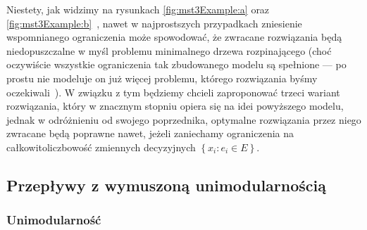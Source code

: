 Niestety, jak widzimy na rysunkach \ref{fig:mst3Example:a} oraz \ref{fig:mst3Example:b}~\cite[$41$]{Magnanti1995503}, nawet w najprostszych przypadkach zniesienie wspomnianego ograniczenia może spowodować, że zwracane rozwiązania będą niedopuszczalne w myśl problemu minimalnego drzewa rozpinającego (choć oczywiście wszystkie ograniczenia tak zbudowanego modelu są spełnione --- po prostu nie modeluje on już więcej problemu, którego rozwiązania byśmy oczekiwali~\cite[$39$]{Magnanti1995503}). W związku z tym będziemy chcieli zaproponować trzeci wariant rozwiązania, który w znacznym stopniu opiera się na idei powyższego modelu, jednak w odróżnieniu od swojego poprzednika, optymalne rozwiązania przez niego zwracane będą poprawne nawet, jeżeli zaniechamy ograniczenia na całkowitoliczbowość zmiennych decyzyjnych $\left\{ x_{i} : e_{i} \in E \right\}$.

\subsection{Przepływy z wymuszoną unimodularnością}

\subsubsection{Unimodularność}

